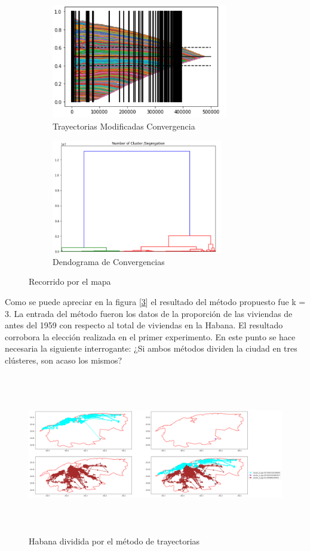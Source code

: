 \begin{figure}[h!]
	\centering
	\begin{subfigure}[b]{0.6\linewidth}
		\includegraphics[width=\linewidth, height=5cm]{Images/Convergency2.png}
		\caption{Trayectorias Modificadas Convergencia}
		\label{fig:Convergency2}
	\end{subfigure}
	\begin{subfigure}[b]{0.6\linewidth}
		\includegraphics[width=\linewidth, height=5cm]{Images/ConvergenciaTrayec.png}
		\caption{Dendograma de Convergencias}
		\label{fig:ConvergenciaTrayec}
	\end{subfigure}
	
	\caption{Recorrido por el mapa}
	\label{fig:TrayectoriasConV}
\end{figure}

Como se puede apreciar en la figura [\ref{fig:TrayectoriasConV}] el resultado del método propuesto fue k = 3. La entrada del método fueron los datos de la proporción de las viviendas de antes del 1959 con respecto al total de viviendas en la Habana. El resultado corrobora la elección realizada en el primer experimento.
En este punto se hace necesaria la siguiente interrogante: ¿Si ambos métodos dividen la ciudad en tres clústeres, son acaso los mismos? 

\begin{figure}[h!]
	\centering
	\includegraphics[width=15cm, height=7cm]{Images/Hab3KTrayec.png}
	\caption{Habana dividida por el método de trayectorias}
	\label{fig:Hab3KTrayec}
\end{figure}

